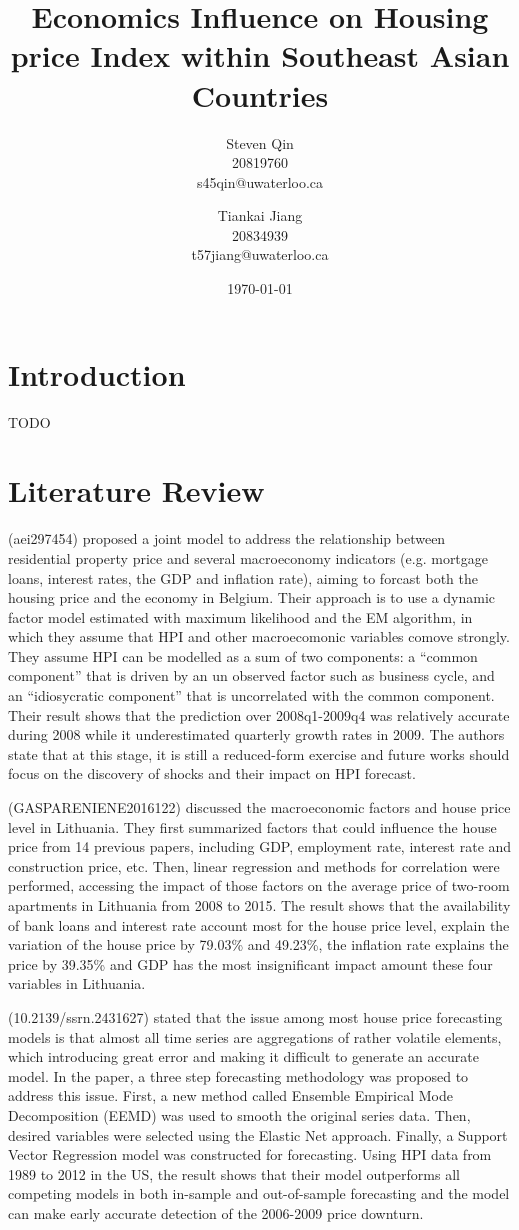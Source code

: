 \documentclass[11pt]{article}
\title{Economics Influence on Housing price Index within Southeast Asian Countries}
\author{Steven Qin\\20819760\\s45qin@uwaterloo.ca \and Tiankai Jiang\\20834939\\t57jiang@uwaterloo.ca}
\date{\today}
\begin{document}
\maketitle

\section{Introduction}\label{introduction}
TODO

\section{Literature Review}\label{literature_review}
(aei297454) proposed a joint model to address the relationship between residential property price and several macroeconomy indicators (e.g. mortgage loans, interest rates, the GDP and inflation rate), aiming to forcast both the housing price and the economy in Belgium. Their approach is to use a dynamic factor model estimated with maximum likelihood and the EM algorithm, in which they assume that HPI and other macroecomonic variables comove strongly. They assume HPI can be modelled as a sum of two components: a ``common component'' that is driven by an un observed factor such as business cycle, and an ``idiosycratic component'' that is uncorrelated with the common component. Their result shows that the prediction over 2008q1-2009q4 was relatively accurate during 2008 while it underestimated quarterly growth rates in 2009. The authors state that at this stage, it is still a reduced-form exercise and future works should focus on the discovery of shocks and their impact on HPI forecast.

(GASPARENIENE2016122) discussed the macroeconomic factors and house price level in Lithuania. They first summarized factors that could influence the house price from 14 previous papers, including GDP, employment rate, interest rate and construction price, etc. Then, linear regression and methods for correlation were performed, accessing the impact of those factors on the average price of two-room apartments in Lithuania from 2008 to 2015. The result shows that the availability of bank loans and interest rate account most for the house price level, explain the variation of the house price by 79.03\% and 49.23\%, the inflation rate explains the price by 39.35\% and GDP has the most insignificant impact amount these four variables in Lithuania.

(10.2139/ssrn.2431627) stated that the issue among most house price forecasting models is that almost all time series are aggregations of rather volatile elements, which introducing great error and making it difficult to generate an accurate model. In the paper, a three step forecasting methodology was proposed to address this issue. First, a new method called Ensemble Empirical Mode Decomposition (EEMD) was used to smooth the original series data. Then, desired variables were selected using the Elastic Net approach. Finally, a Support Vector Regression model was constructed for forecasting. Using HPI data from 1989 to 2012 in the US, the result shows that their model outperforms all competing models in both in-sample and out-of-sample forecasting and the model can make early accurate detection of the 2006-2009 price downturn.
\end{document}
